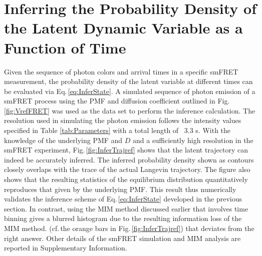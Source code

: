 \documentclass[journal=jpcbfk,manuscript=article,layout=twocolumn,articletitle=true]{achemso}
\begin{document}
\section{Inferring the Probability Density of the Latent Dynamic Variable as a Function of Time}

Given the sequence of photon colors and arrival times in a specific smFRET measurement, the probability density of the latent variable at different times can be evaluated via Eq.\,\ref{eq:InferState}. A simulated sequence of photon emission of a smFRET process using the PMF and diffusion coefficient outlined in Fig.\,\ref{fig:VrefFRET} was used as the data set to perform the inference calculation. The resolution used in simulating the photon emission follows the intensity values specified in Table \ref{tab:Parameters} with a total length of ~3.3 s. With the knowledge of the underlying PMF and $D$ and a sufficiently high resolution in the smFRET experiment, Fig.\,\ref{fig:InferTrajref} shows that the latent trajectory can indeed be accurately inferred. The inferred probability density shown as contours closely overlaps with the trace of the actual Langevin trajectory. The figure also shows that the resulting statistics of the equilibrium distribution quantitatively reproduces that given by the underlying PMF. This result thus numerically validates the inference scheme of Eq.\,\ref{eq:InferState} developed in the previous section. In contrast, using the MIM method discussed earlier that involves time binning gives a blurred histogram due to the resulting information loss of the MIM method. (cf.\,the orange bars in Fig.\,\ref{fig:InferTrajref}) that deviates from the right answer. Other details of the smFRET simulation and MIM analysis are reported in Supplementary Information.
\end{document}
